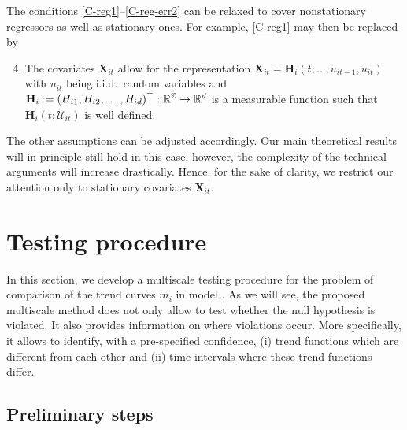 \documentclass[a4paper,12pt]{article}
\makeatletter
\renewcommand{\eqref}[1]{\tagform@{\ref{#1}}}
\makeatother
\begin{document}
\begin{remark}
The conditions \ref{C-reg1}--\ref{C-reg-err2} can be relaxed to cover nonstationary regressors as well as stationary ones. For example, \ref{C-reg1} may then be replaced by
\begin{enumerate}[label=(C\arabic*$^\ast$),leftmargin=1.05cm]
\setcounter{enumi}{3}
\item \label{C-reg1-star} The covariates $ \mathbf{X}_{it}$ allow for the representation $ \mathbf{X}_{it} = \mathbf{H}_i(t; \ldots,u_{it-1},u_{it})$ with $u_{it}$ being i.i.d.\ random variables and $\mathbf{H}_i := (H_{i1}, H_{i2}, \ldots, H_{id})^\top: \mathbb{R}^{\mathbb{Z}} \rightarrow \mathbb{R}^d$ is a measurable function such that $\mathbf{H}_i(t;\mathcal{U}_{it})$ is well defined. 
\end{enumerate} 
The other assumptions can be adjusted accordingly. Our main theoretical results will in principle still hold in this case, however, the complexity of the technical arguments will increase drastically. Hence, for the sake of clarity, we restrict our attention only to stationary  covariates $\mathbf{X}_{it}$. 
\end{remark}


\section{Testing procedure}\label{sec:test}

In this section, we develop a multiscale testing procedure for the problem of comparison of the trend curves $m_i$ in model \eqref{eq:model_full}.  As we will see, the proposed multiscale method does not only allow to test whether the null hypothesis is violated. It also provides information on where violations occur. More specifically, it allows to identify, with a pre-specified confidence, (i) trend functions which are different from each other and (ii) time intervals where these trend functions differ.

\subsection{Preliminary steps}\label{subsec:test:prep}
\end{document}
